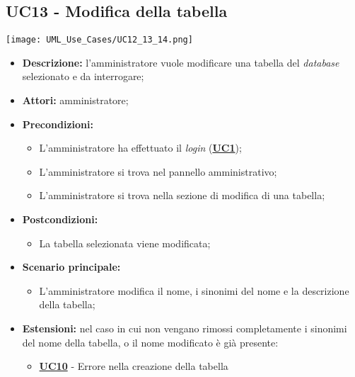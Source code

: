 \subsection{UC13 - Modifica della tabella}
\label{sec:UC13}
\texttt{[image: UML\_Use\_Cases/UC12\_13\_14.png]}
\begin{itemize}
	\item \textbf{Descrizione:} l’amministratore vuole modificare una tabella del \textit{database} selezionato e da interrogare;
	\item \textbf{Attori:} amministratore;
	\item \textbf{Precondizioni:} 
	\begin{itemize}
		\item L’amministratore ha effettuato il \textit{login} (\hyperref[sec:UC1]{\textbf{UC1}});
		\item L’amministratore si trova nel pannello amministrativo;
		\item L’amministratore si trova nella sezione di modifica di una tabella;
	\end{itemize}
	\item \textbf{Postcondizioni:} 
	\begin{itemize}
		\item La tabella selezionata viene modificata;
	\end{itemize}
	\item \textbf{Scenario principale:} 
	\begin{itemize}
		\item L’amministratore modifica il nome, i sinonimi del nome e la descrizione della tabella;
	\end{itemize}
	\item \textbf{Estensioni:} nel caso in cui non vengano rimossi completamente i sinonimi del nome della tabella, o il nome modificato è già presente:
	\begin{itemize}
		\item \hyperref[sec:UC10]{\textbf{UC10}} - Errore nella creazione della tabella
	\end{itemize}
\end{itemize}

